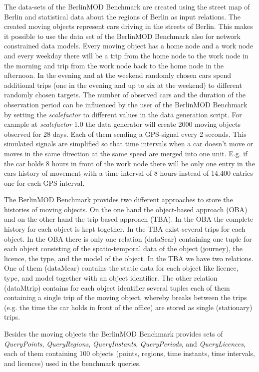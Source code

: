 \documentclass[a4paper]{article}
\newcommand{\bmodb} {BerlinMOD Benchmark}
\newcommand{\var}[1]{\textsl{#1}}
\begin{document}
The data-sets of the \bmodb{} are created using the street map of Berlin \cite{bbike} and statistical data about the regions of Berlin \cite{bevberlin,berlinstadtatlas} as input relations. The created moving objects represent cars driving in the streets of Berlin. This makes it possible to use the data set of the \bmodb{} also for network constrained data models. Every moving object has a home node and a work node and every weekday there will be a trip from the home node to the work node in the morning and trip from the work node back to the home node in the afternoon. In the evening and at the weekend randomly chosen cars spend additional trips (one in the evening and up to six at the weekend) to different randomly chosen targets. The number of observed cars and the duration of the observation period can be influenced by the user of the \bmodb{} by setting the \var{scalefactor} to different values in the data generation script. For example at \var{scalefactor} 1.0 the data generator will create 2000 moving objects observed for 28 days. Each of them sending a GPS-signal every 2 seconds. This simulated signals are simplified so that time intervals when a car doesn't move or moves in the same direction at the same speed are merged into one unit. E.g. if the car holds 8 hours in front of the work node there will be only one entry in the cars history of movement with a time interval of 8 hours instead of 14.400 entries one for each GPS interval.

The \bmodb{} provides two different approaches to store the histories of moving objects. On the one hand the object-based approach (OBA) and on the other hand the trip based approach (TBA). In the OBA the complete history for each object is kept together. In the TBA exist several trips for each object. In the OBA there is only one relation (dataScar) containing one tuple for each object consisting of the spatio-temporal data of the object (journey), the licence, the type, and the model of the object. In the TBA we have two relations. One of them (dataMcar) contains the static data for each object like licence, type, and model together with an object identifier. The other relation (dataMtrip) contains for each object identifier several tuples each of them containing a single trip of the moving object, whereby breaks between the trips (e.g. the time the car holds in front of the office) are stored as single (stationary) trips.

Besides the moving objects the \bmodb{} provides sets of \var{QueryPoints}, \var{QueryRegions}, \var{QueryInstants}, \var{QueryPeriods}, and \var{QueryLicences}, each of them containing 100 objects (points, regions, time instants, time intervals, and licences) used in the benchmark queries.
\end{document}
